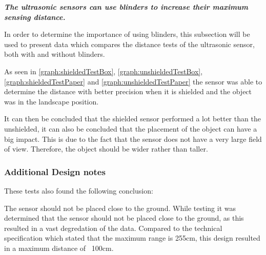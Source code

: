 \textit{\textbf{The ultrasonic sensors can use blinders to increase their
maximum sensing distance.}}\nl

In order to determine the importance of using blinders, this subsection will be
used to present data which compares the distance tests of the ultrasonic sensor,
both with and without blinders.






As seen in \autoref{graph:shieldedTestBox}, \autoref{graph:unshieldedTestBox},
\autoref{graph:shieldedTestPaper} and \autoref{graph:unshieldedTestPaper} the
sensor was able to determine the distance with better precision when it is
shielded and the object was in the landscape position. \nl

It can then be concluded that the shielded sensor performed a lot better than
the unshielded, it can also be concluded that the placement of the object can
have a big impact. This is due to the fact that the sensor does not have a very
large field of view. Therefore, the object should be wider rather than taller.

\subsubsection{Additional Design notes}
These tests also found the following conclusion:\nl

The sensor should not be placed close to the ground. While testing it was
determined that the sensor should not be placed close to the ground, as this
resulted in a vast degredation of the data. Compared to the technical
specification which stated that the maximum range is 255cm, this design resulted
in a maximum distance of ~100cm.\nl

